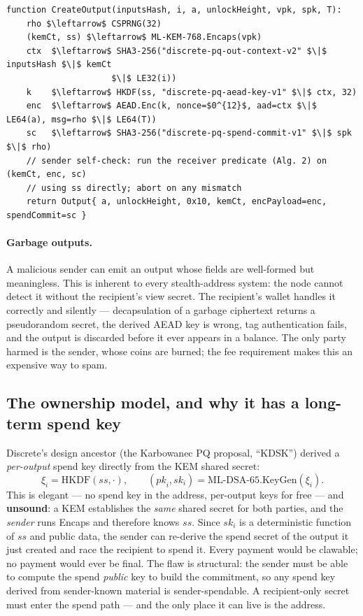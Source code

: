 \documentclass[11pt,a4paper]{article}
\newcommand{\HKDF}{\mathrm{HKDF}}
\newcommand{\DSA}{\mathrm{ML\text{-}DSA\text{-}65}}
\begin{document}
\begin{algorithm}[tbp]
\caption{\textsc{CreateOutput} --- sender side (per output $i$ of amount $a$ to address $(\mathit{vpk}, \mathit{spk})$, routing index $T$).}
\label{alg:createoutput}
\begin{lstlisting}[style=pseudo]
function CreateOutput(inputsHash, i, a, unlockHeight, vpk, spk, T):
    rho $\leftarrow$ CSPRNG(32)
    (kemCt, ss) $\leftarrow$ ML-KEM-768.Encaps(vpk)
    ctx  $\leftarrow$ SHA3-256("discrete-pq-out-context-v2" $\|$ inputsHash $\|$ kemCt
                     $\|$ LE32(i))
    k    $\leftarrow$ HKDF(ss, "discrete-pq-aead-key-v1" $\|$ ctx, 32)
    enc  $\leftarrow$ AEAD.Enc(k, nonce=$0^{12}$, aad=ctx $\|$ LE64(a), msg=rho $\|$ LE64(T))
    sc   $\leftarrow$ SHA3-256("discrete-pq-spend-commit-v1" $\|$ spk $\|$ rho)
    // sender self-check: run the receiver predicate (Alg. 2) on (kemCt, enc, sc)
    // using ss directly; abort on any mismatch
    return Output{ a, unlockHeight, 0x10, kemCt, encPayload=enc, spendCommit=sc }
\end{lstlisting}
\end{algorithm}

\paragraph{Garbage outputs.}
A malicious sender can emit an output whose fields are well-formed but
meaningless. This is inherent to every stealth-address system: the node
cannot detect it without the recipient's view secret. The recipient's wallet
handles it correctly and silently --- decapsulation of a garbage ciphertext
returns a pseudorandom secret, the derived AEAD key is wrong, tag
authentication fails, and the output is discarded before it ever appears in a
balance. The only party harmed is the sender, whose coins are burned; the
fee requirement makes this an expensive way to spam.

\subsection{The ownership model, and why it has a long-term spend key}
\label{sec:ownership}

Discrete's design ancestor (the Karbowanec PQ proposal, ``KDSK'') derived a
\emph{per-output} spend key directly from the KEM shared secret:
\[
\xi_i = \HKDF(\mathit{ss}, \cdot), \qquad
(\mathit{pk}_i, \mathit{sk}_i) = \DSA.\mathrm{KeyGen}(\xi_i).
\]
This is elegant --- no spend key in the address,
per-output keys for free --- and \textbf{unsound}: a KEM establishes the
\emph{same} shared secret for both parties, and the \emph{sender} runs
Encaps and therefore knows $\mathit{ss}$. Since $\mathit{sk}_i$ is a
deterministic function of $\mathit{ss}$ and public data, the sender can
re-derive the spend secret of the output it just created and race the
recipient to spend it. Every payment would be clawable; no payment would
ever be final. The flaw is structural: the sender must be able to compute the
spend \emph{public} key to build the commitment, so any spend key derived
from sender-known material is sender-spendable. A recipient-only secret must
enter the spend path --- and the only place it can live is the address.
\end{document}
